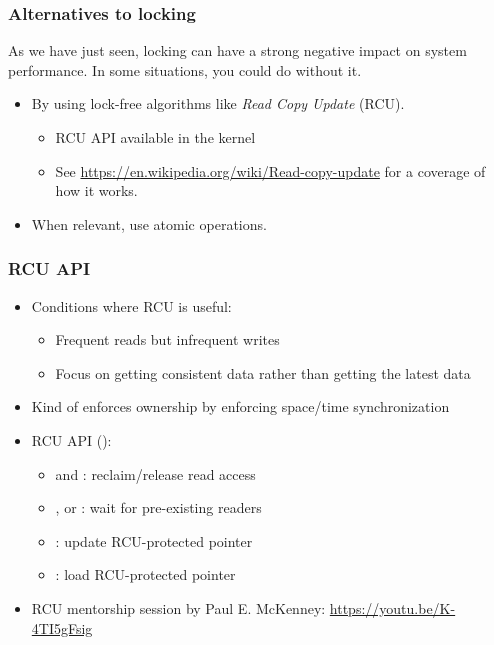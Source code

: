 

\begin{frame}
  \frametitle{Alternatives to locking}
  As we have just seen, locking can have a strong negative
  impact on system performance. In some situations, you could do
  without it.
  \begin{itemize}
  \item By using lock-free algorithms like \emph{Read Copy Update}
    (RCU).
    \begin{itemize}
    \item RCU API available in the kernel
    \item See \url{https://en.wikipedia.org/wiki/Read-copy-update} for a
      coverage of how it works.
    \end{itemize}
  \item When relevant, use atomic operations.
  \end{itemize}
\end{frame}

\begin{frame}[fragile]
  \frametitle{RCU API}
  \begin{itemize}
  \item Conditions where RCU is useful:
    \begin{itemize}
    \item Frequent reads but infrequent writes
    \item Focus on getting consistent data rather than getting the
      latest data
    \end{itemize}
  \item Kind of enforces ownership by enforcing space/time synchronization
  \item RCU API ():
    \begin{itemize}
    \item {} and :
      reclaim/release read access
    \item {},  or : wait for
      pre-existing readers
    \item {}: update RCU-protected pointer
    \item {}: load RCU-protected pointer
    \end{itemize}
  \item RCU mentorship session by Paul E. McKenney:
    \url{https://youtu.be/K-4TI5gFsig}
  \end{itemize}
\end{frame}

